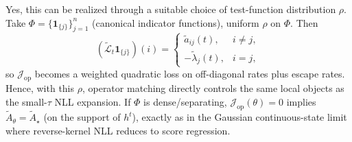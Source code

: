 Yes, this can be realized through a suitable choice of test-function distribution $\rho$.
Take $\Phi=\{\mathbf 1_{\{j\}}\}_{j=1}^n$ (canonical indicator functions), uniform $\rho$ on $\Phi$.
Then
\[
(\widetilde{\mathcal L}_t\mathbf 1_{\{j\}})(i)=
\begin{cases}
\widetilde a_{ij}(t), & i\neq j,\\
-\widetilde\lambda_j(t), & i=j,
\end{cases}
\]
so $\mathcal J_{\mathrm{op}}$ becomes a weighted quadratic loss on off-diagonal rates plus escape rates.
Hence, with this $\rho$, operator matching directly controls the same local objects as the small-$\tau$ NLL expansion.
If $\Phi$ is dense/separating, $\mathcal J_{\mathrm{op}}(\theta)=0$ implies $\widetilde A_\theta=\widetilde A_\star$ (on the support of $h^t$), exactly as in the Gaussian continuous-state limit where reverse-kernel NLL reduces to score regression.
